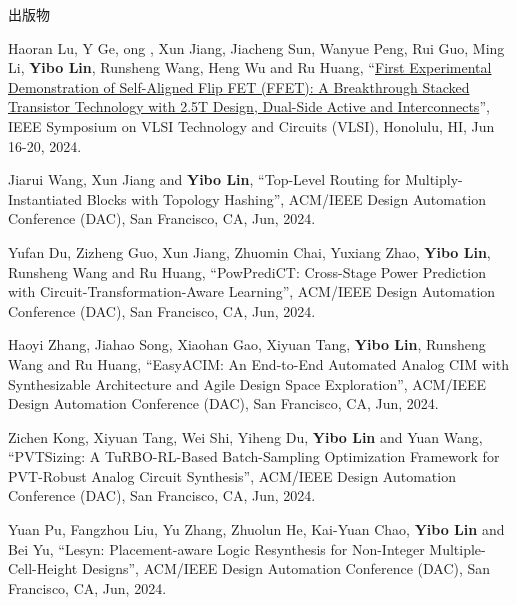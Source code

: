 \begin{rSection}{出版物}
\begin{description}[font=\normalfont, rightmargin=2em]
\item[{[C103]}]{
        Haoran Lu, Y Ge, ong , Xun Jiang, Jiacheng Sun, Wanyue Peng, Rui Guo, Ming Li, \textbf{Yibo Lin}, Runsheng Wang, Heng Wu and Ru Huang, 
    ``\href{https://doi.org/10.1109/VLSITechnologyandCir46783.2024.10631460}{First Experimental Demonstration of Self-Aligned Flip FET (FFET): A Breakthrough Stacked Transistor Technology with 2.5T Design, Dual-Side Active and Interconnects}'', 
    IEEE Symposium on VLSI Technology and Circuits (VLSI), Honolulu, HI, Jun 16-20, 2024.
    
}
            

\item[{[C102]}]{
        Jiarui Wang, Xun Jiang and \textbf{Yibo Lin}, 
    ``Top-Level Routing for Multiply-Instantiated Blocks with Topology Hashing'', 
    ACM/IEEE Design Automation Conference (DAC), San Francisco, CA, Jun, 2024.
    
}
            

\item[{[C101]}]{
        Yufan Du, Zizheng Guo, Xun Jiang, Zhuomin Chai, Yuxiang Zhao, \textbf{Yibo Lin}, Runsheng Wang and Ru Huang, 
    ``PowPrediCT: Cross-Stage Power Prediction with Circuit-Transformation-Aware Learning'', 
    ACM/IEEE Design Automation Conference (DAC), San Francisco, CA, Jun, 2024.
    
}
            

\item[{[C100]}]{
        Haoyi Zhang, Jiahao Song, Xiaohan Gao, Xiyuan Tang, \textbf{Yibo Lin}, Runsheng Wang and Ru Huang, 
    ``EasyACIM: An End-to-End Automated Analog CIM with Synthesizable Architecture and Agile Design Space Exploration'', 
    ACM/IEEE Design Automation Conference (DAC), San Francisco, CA, Jun, 2024.
    
}
            

\item[{[C99]}]{
        Zichen Kong, Xiyuan Tang, Wei Shi, Yiheng Du, \textbf{Yibo Lin} and Yuan Wang, 
    ``PVTSizing: A TuRBO-RL-Based Batch-Sampling Optimization Framework for PVT-Robust Analog Circuit Synthesis'', 
    ACM/IEEE Design Automation Conference (DAC), San Francisco, CA, Jun, 2024.
    
}
            

\item[{[C98]}]{
        Yuan Pu, Fangzhou Liu, Yu Zhang, Zhuolun He, Kai-Yuan Chao, \textbf{Yibo Lin} and Bei Yu, 
    ``Lesyn: Placement-aware Logic Resynthesis for Non-Integer Multiple-Cell-Height Designs'', 
    ACM/IEEE Design Automation Conference (DAC), San Francisco, CA, Jun, 2024.
    
}
\end{description}
\end{rSection}
